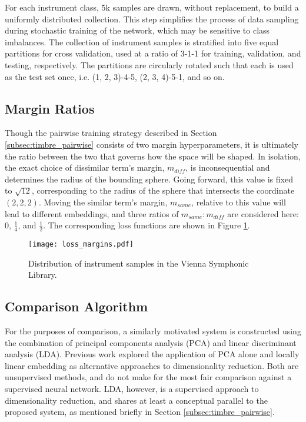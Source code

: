 For each instrument class, 5k samples are drawn, without replacement, to build a uniformly distributed collection.
This step simplifies the process of data sampling during stochastic training of the network, which may be sensitive to class imbalances.
The collection of instrument samples is stratified into five equal partitions for cross validation, used at a ratio of 3-1-1 for training, validation, and testing, respectively.
The partitions are circularly rotated such that each is used as the test set once, i.e. (1, 2, 3)-4-5, (2, 3, 4)-5-1, and so on.


\subsection{Margin Ratios}

Though the pairwise training strategy described in Section \ref{subsec:timbre_pairwise} consists of two margin hyperparameters, it is ultimately the ratio between the two that governs how the space will be shaped.
In isolation, the exact choice of dissimilar term's margin, $m_{diff}$, is inconsequential and determines the radius of the bounding sphere.
Going forward, this value is fixed to $\sqrt{12}$, corresponding to the radius of the sphere that intersects the coordinate $(2, 2, 2)$.
Moving the similar term's margin, $m_{same}$, relative to this value will lead to different embeddings, and three ratios of $m_{same}:m_{diff}$ are considered here: 0, $\frac{1}{4}$, and $\frac{1}{2}$.
The corresponding loss functions are shown in Figure \ref{fig:margins}.


\begin{figure}[h]
\centering
\texttt{[image: loss\_margins.pdf]}
\caption{Distribution of instrument samples in the Vienna Symphonic Library.}
\label{fig:margins}
\end{figure}



\subsection{Comparison Algorithm}

For the purposes of comparison, a similarly motivated system is constructed using the combination of principal components analysis (PCA) and linear discriminant analysis (LDA).
Previous work explored the application of PCA alone and locally linear embedding as alternative approaches to dimensionality reduction.
Both are unsupervised methods, and do not make for the most fair comparison against a supervised neural network.
LDA, however, is a supervised approach to dimensionality reduction, and shares at least a conceptual parallel to the proposed system, as mentioned briefly in Section \ref{subsec:timbre_pairwise}.

